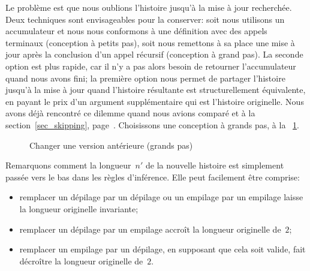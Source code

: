 Le problème est que nous oublions l'histoire jusqu'à la mise à jour
recherchée. Deux techniques sont envisageables pour la conserver: soit
nous utilisons un accumulateur
et nous nous conformons à une définition avec des appels
terminaux (conception à
petits pas), soit nous remettons à sa
place une mise à jour après la conclusion d'un appel récursif
(conception à grand pas). La seconde
option est plus rapide, car il n'y a pas alors besoin de retourner
l'accumulateur quand nous avons fini; la première option nous permet
de partager l'histoire jusqu'à la mise à jour quand l'histoire
résultante est structurellement équivalente, en payant le prix d'un
argument supplémentaire qui est l'histoire originelle. Nous avons déjà
rencontré ce dilemme quand nous avions comparé
 et
 à la
section~\ref{sec_skipping}, page~\pageref{sec_skipping}. Choisissons
une conception à grands pas, à la \fig~\ref{fig_chg}.
\begin{figure}[b]
\centering
{}
\caption{Changer une version antérieure (grands pas)\label{fig_chg}}
\end{figure}
Remarquons comment la longueur~\(n'\) de la nouvelle histoire est
simplement passée vers le bas dans les règles d'inférence. Elle peut
facilement être comprise:
\begin{itemize}

  \item remplacer un dépilage par un dépilage ou un empilage par un
    empilage laisse la longueur originelle invariante;

  \item remplacer un dépilage par un empilage accroît la longueur
    originelle de~\(2\);

  \item remplacer un empilage par un dépilage, en supposant que cela
    soit valide, fait décroître la longueur originelle de~\(2\).

\end{itemize}
